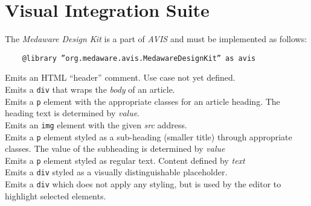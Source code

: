 \section{Visual Integration Suite}
\vspace{1.5mm}
The \textit{Medaware Design Kit} is a part of \textit{AVIS} and must be implemented as follows:
\begin{verbatim}
	@library ”org.medaware.avis.MedawareDesignKit” as avis
\end{verbatim}
\begin{multicols*}{2}
	Emits an HTML ``header'' comment.
	Use case not yet defined.\\[\baselineskip]
	Emits a \verb|div| that wraps the \textit{body} of an article.\\[\baselineskip]
	Emits a \verb|p| element with the appropriate classes for an article heading.
	The heading text is determined by \textit{value}.\\[\baselineskip]
	Emits an \verb|img| element with the given \textit{src} address.\\[\baselineskip]
	Emits a \verb|p| element styled as a sub-heading (smaller title) through appropriate classes.
	The value of the subheading is determined by \textit{value}\\[\baselineskip]
	Emits a \verb|p| element styled as regular text.
	Content defined by \textit{text}\\[\baselineskip]
	Emits a \verb|div| styled as a visually distinguishable placeholder.\\[\baselineskip]
	Emits a \verb|div| which does not apply any styling, but is used by the editor to highlight selected elements.
\end{multicols*}
\newpage